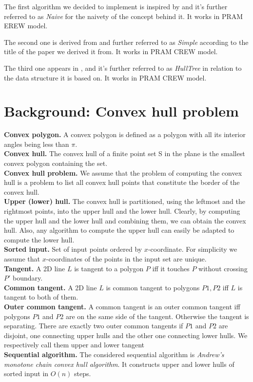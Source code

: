 \documentclass[letterpaper]{article}
\newcommand{\mypar}[1]{{\bf #1.}}
\theoremstyle{definition}
\begin{document}
The first algorithm we decided to implement is inspired by \cite{NaiveParallel} and it's further referred to as \textit{Naive} for the naivety of the concept behind it.
It works in PRAM EREW model.

The second one is derived from \cite{SimpleParallel} and further referred to as \textit{Simple} according to the title of the paper we derived it from.
It works in PRAM CREW model.
 
The third one appears in \cite{HullTree}, and it's further referred to as \textit{HullTree} in relation to the data structure it is based on.
It works in PRAM CREW model.
     
\section{Background: Convex hull problem}\label{sec:background}

\mypar{Convex polygon} A convex polygon is defined as a polygon with all its interior angles being less than $\pi$.\\
\mypar{Convex hull}
The convex hull of a finite point set S in the plane is the smallest convex polygon containing the set.\\
\mypar{Convex hull problem}
We assume that the problem of computing the convex hull is a problem to list all convex hull points that constitute the border of the convex hull.\\
\mypar{Upper (lower) hull}
The convex hull is partitioned, using the leftmost and the rightmost points, into the upper hull and the lower hull. 
Clearly, by computing the upper hull and the lower hull and combining them, we can obtain the convex hull. 
Also, any algorithm to compute the upper hull can easily be adapted to compute the lower hull.\\
\mypar{Sorted input} 
Set of input points ordered by $x$-coordinate. 
For simplicity we assume that $x$-coordinates of the points in the input set are unique.\\
\mypar{Tangent} 
 A 2D line $L$ is tangent to a polygon $P$ iff it touches $P$ without crossing $P'$ boundary.\\
\mypar{Common tangent} 
A 2D line $L$ is common tangent to polygons $P1, P2$ iff $L$ is tangent to both of them.\\
\mypar{Outer common tangent}
A common tangent is an outer common tangent iff polygons $P1$ and $P2$ are on the same side of the tangent.
Otherwise the tangent is separating.
There are exactly two outer common tangents if $P1$ and $P2$ are disjoint, one connecting upper hulls and the other one connecting lower hulls. \cite{DBLP:journals/corr/Abrahamsen15}
We respectively call them upper and lower tangent\\
\mypar{Sequential algorithm}
The considered sequential algorithm is \textit{Andrew's monotone chain convex hull algorithm}. It constructs upper and lower hulls of sorted input in $O(n)$ steps. \cite{DBLP:journals/ipl/Andrew79} 
\end{document}
